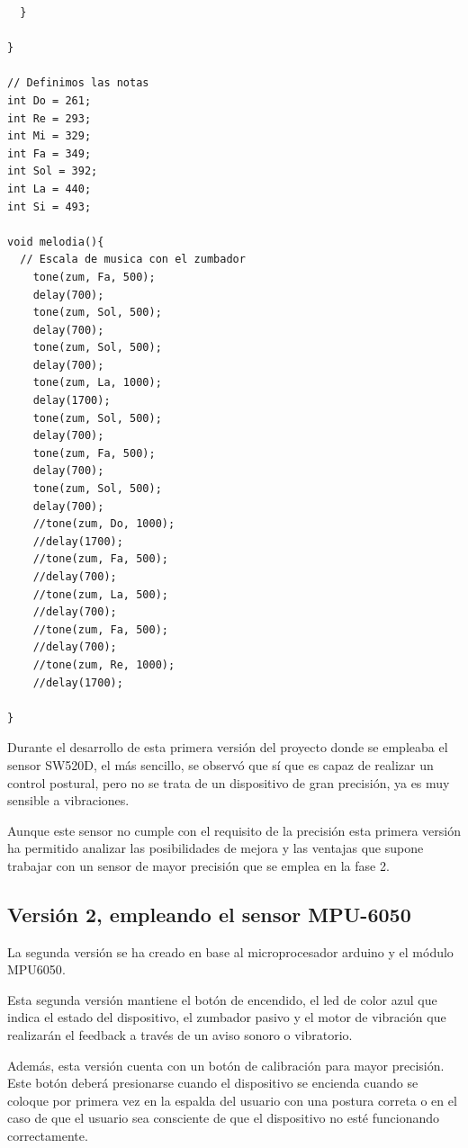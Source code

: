 \begin{lstlisting}
  }

}

// Definimos las notas
int Do = 261;
int Re = 293;
int Mi = 329;
int Fa = 349;
int Sol = 392;
int La = 440;
int Si = 493;

void melodia(){
  // Escala de musica con el zumbador
    tone(zum, Fa, 500);
    delay(700);
    tone(zum, Sol, 500);
    delay(700);
    tone(zum, Sol, 500);
    delay(700);
    tone(zum, La, 1000);
    delay(1700);
    tone(zum, Sol, 500);
    delay(700);
    tone(zum, Fa, 500);
    delay(700);
    tone(zum, Sol, 500);
    delay(700);
    //tone(zum, Do, 1000);
    //delay(1700);
    //tone(zum, Fa, 500);
    //delay(700);
    //tone(zum, La, 500);
    //delay(700);
    //tone(zum, Fa, 500);
    //delay(700);
    //tone(zum, Re, 1000);
    //delay(1700);
    
}

\end{lstlisting}

Durante el desarrollo de esta primera versión del proyecto donde se empleaba el sensor SW520D, el más sencillo, se observó que sí que es capaz de realizar un control postural, pero no se trata de un dispositivo de gran precisión, ya es muy sensible a vibraciones.

Aunque este sensor no cumple con el requisito de la precisión esta primera versión ha permitido analizar las posibilidades de mejora y las ventajas que supone trabajar con un sensor de mayor precisión que se emplea en la fase 2.


\subsection{Versión 2, empleando el sensor MPU-6050}

La segunda versión se ha creado  en base al microprocesador arduino y el módulo MPU6050\cite{MPU6050_1,MPU6050_2}.

Esta segunda versión mantiene el botón de encendido, el led de color azul que indica el estado del dispositivo, el zumbador pasivo y el motor de vibración que realizarán el feedback a través de un aviso sonoro o vibratorio.

Además, esta versión cuenta con un botón de calibración para mayor precisión. Este botón deberá presionarse cuando el dispositivo se encienda cuando se coloque por primera vez en la espalda del usuario con una postura correta o en el caso de que el usuario sea consciente de que el dispositivo no esté funcionando correctamente.  

